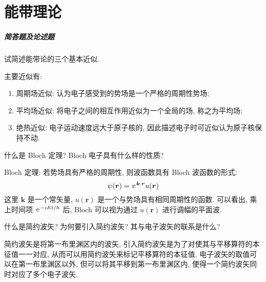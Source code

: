 \documentclass[UTF8]{ctexart}
\newenvironment{Answer}{}{}
\begin{document}
\section{能带理论}
    \subparagraph{简答题及论述题}
        \begin{Question}
            \item 试简述能带论的三个基本近似.

\begin{Answer}
    \begin{Solve}[Solve:]
        \hspace*{2em}主要近似有:
            \begin{enumerate}
                \item 周期场近似: 认为电子感受到的势场是一个严格的周期性势场;
                \item 平均场近似: 将电子之间的相互作用近似为一个全局的场, 称之为平均场;
                \item 绝热近似: 电子运动速度远大于原子核的, 因此描述电子时可近似认为原子核保持不动.
            \end{enumerate}
    \end{Solve}
\end{Answer}

            \item 什么是 Bloch 定理? Bloch 电子具有什么样的性质?

\begin{Answer}
    \begin{Solve}[Solve:]
        \hspace*{2em}Bloch 定理: 若势场具有严格的周期性, 则波函数具有 Bloch 波函数的形式:
            \begin{equation*}
                \psi(\bm{r}) = \mspace{2mu}\mathrm{e}\mspace{2mu}^{\bm{k} \cdot \bm{r}} u(\bm{r})
            \end{equation*}
        这里 $\bm{k}$ 是一个常矢量, $u(\bm{r})$ 是一个与势场具有相同周期性的函数. 可以看出, 乘上时间项 $\mspace{2mu}\mathrm{e}\mspace{2mu}^{-i E t / \hbar}$ 后, Bloch 可以视为通过 $u(\bm{r})$ 进行调幅的平面波.
    \end{Solve}
\end{Answer}

            \item 什么是简约波矢? 为何要引入简约波矢? 其与电子波矢的联系是什么?

\begin{Answer}
    \begin{Solve}[Solve:]
        \hspace*{2em}简约波矢是将第一布里渊区内的波矢, 引入简约波矢是为了对使其与平移算符的本征值一一对应, 从而可以用简约波矢来标记平移算符的本征值. 电子波矢的取值可以在第一布里渊区以外, 但可以将其平移到第一布里渊区内, 使得一个简约波矢同时对应了多个电子波矢.
    \end{Solve}
\end{Answer}


\end{Question}
\end{document}
